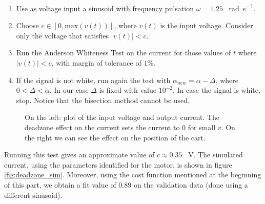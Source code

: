 \begin{enumerate}
\item Use as voltage input a sinusoid with frequency pulsation $\omega = 1.25$ \SI{}{\radian \per \second}. 
\item Choose $c \in [0, \text{max}(v(t))]$, where $v(t)$ is the input voltage. Consider only the voltage that satisfies $|v(t)| < c$.
\item Run the Anderson Whiteness Test on the current for those values of $t$ where $|v(t)|<c$, with margin of tolerance of $1$\%.
\item {If the signal is not white, run again the test with $\alpha_{new}=\alpha-\Delta$,  where $0<\Delta < \alpha$. In our case $\Delta$ is fixed with value $10^{-2}$. In case the signal is white, stop. Notice that the bisection method cannot be used.}
\end{enumerate}
  \begin{figure}[!tbh]
  \centering
  \hfill
  \caption{On the left: plot of the input voltage and output current. The deadzone effect on the current sets the current to 0 for small $v$. On the right  we can see the effect on the position of the cart.}
    \label{fig:curposvolt}
\end{figure}
Running this test gives an approximate value of $c \approx 0.35$ \SI{}{\volt}. The simulated current, using the parameters identified for the motor, is shown in figure \ref{fig:deadzone_sim}. Moreover, using the cost function  mentioned at the beginning of this part, we obtain a fit value of $0.89$ on the validation data (done using a different sinusoid). \\ \\
